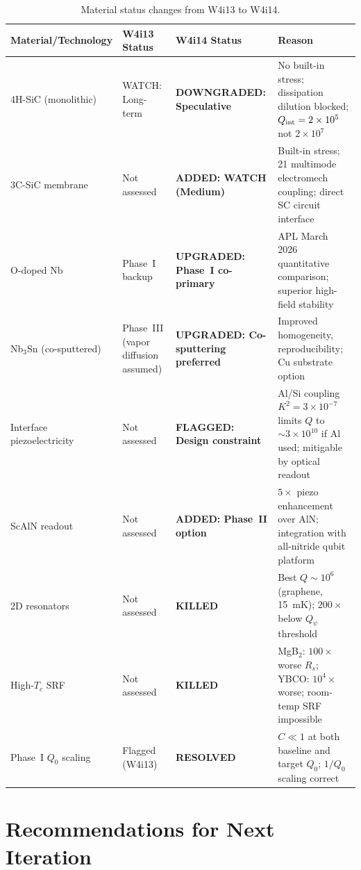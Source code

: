 \documentclass[11pt]{article}
\theoremstyle{definition}
\theoremstyle{remark}
\newcommand{\ee}[1]{\times 10^{#1}}
\newcommand{\Qpsi}{Q_\psi}
\begin{document}
\begin{table}[H]
\centering
\caption{Material status changes from W4i13 to W4i14.}
\renewcommand{\arraystretch}{1.3}
\begin{tabular}{p{4cm}p{2.5cm}p{2.5cm}p{4cm}}
\toprule
\textbf{Material/Technology} & \textbf{W4i13 Status} &
\textbf{W4i14 Status} & \textbf{Reason} \\
\midrule
4H-SiC (monolithic) & WATCH: Long-term & \textbf{DOWNGRADED:
Speculative} & No built-in stress; dissipation dilution blocked;
$Q_{\rm int} = 2\ee{5}$ not $2\ee{7}$ \\
\midrule
3C-SiC membrane & Not assessed & \textbf{ADDED: WATCH (Medium)} &
Built-in stress; 21 multimode electromech coupling; direct SC
circuit interface \\
\midrule
O-doped Nb & Phase~I backup & \textbf{UPGRADED: Phase~I co-primary} &
APL March 2026 quantitative comparison; superior high-field stability \\
\midrule
Nb$_3$Sn (co-sputtered) & Phase~III (vapor diffusion assumed) &
\textbf{UPGRADED: Co-sputtering preferred} & Improved homogeneity,
reproducibility; Cu substrate option \\
\midrule
Interface piezoelectricity & Not assessed & \textbf{FLAGGED:
Design constraint} & Al/Si coupling $K^2 = 3\ee{-7}$ limits $Q$ to
$\sim 3\ee{10}$ if Al used; mitigable by optical readout \\
\midrule
ScAlN readout & Not assessed & \textbf{ADDED: Phase~II option} &
$5\times$ piezo enhancement over AlN; integration with all-nitride
qubit platform \\
\midrule
2D resonators & Not assessed & \textbf{KILLED} & Best $Q \sim 10^6$
(graphene, 15~mK); $200\times$ below $\Qpsi$ threshold \\
\midrule
High-$T_c$ SRF & Not assessed & \textbf{KILLED} & MgB$_2$: $100\times$
worse $R_s$; YBCO: $10^4\times$ worse; room-temp SRF impossible \\
\midrule
Phase~I $Q_0$ scaling & Flagged (W4i13) & \textbf{RESOLVED} &
$C \ll 1$ at both baseline and target $Q_0$; $1/Q_0$ scaling correct \\
\bottomrule
\end{tabular}
\end{table}


\section{Recommendations for Next Iteration}
\label{sec:next}
\end{document}
